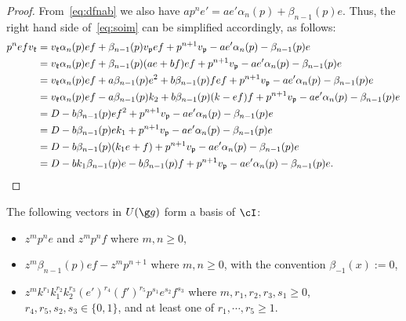 \documentclass[11pt]{amsart}
\begin{document}
\begin{proof}
From~\eqref{eq:dfnab} we also have
$ap^ne'=ae'\alpha_{n}(p)+\beta_{n-1}(p)e$.
Thus, the right hand side of~\eqref{eq:soim} can be simplified accordingly, as follows: 
\begin{align*}
p^nefv_{\mathfrak k}&=v_{\mathfrak k}\alpha_{n}(p)ef+\beta_{n-1}(p)v_{\mathfrak p}ef+p^{n+1}v_{\mathfrak p}-ae'\alpha_{n}(p)-\beta_{n-1}(p)e\\
&=v_{\mathfrak k}\alpha_{n}(p)ef+\beta_{n-1}(p)(ae+bf)ef+p^{n+1}v_{\mathfrak p}-ae'\alpha_{n}(p)-\beta_{n-1}(p)e\\
&=v_{\mathfrak k}\alpha_{n}(p)ef+a\beta_{n-1}(p)e^2+b\beta_{n-1}(p)fef+p^{n+1}v_{\mathfrak p}-ae'\alpha_{n}(p)-\beta_{n-1}(p)e\\
&=v_{\mathfrak k}\alpha_{n}(p)ef-a\beta_{n-1}(p)k_2+b\beta_{n-1}(p)(k-ef)f+p^{n+1}v_{\mathfrak p}-ae'\alpha_{n}(p)-\beta_{n-1}(p)e\\
&=D-b\beta_{n-1}(p)ef^2+p^{n+1}v_{\mathfrak p}-ae'\alpha_{n}(p)-\beta_{n-1}(p)e\\
&=D-b\beta_{n-1}(p)ek_1+p^{n+1}v_{\mathfrak p}-ae'\alpha_{n}(p)-\beta_{n-1}(p)e\\
&=D-b\beta_{n-1}(p)(k_1e+f)+p^{n+1}v_{\mathfrak p}-ae'\alpha_{n}(p)-\beta_{n-1}(p)e\\
&=D-bk_1\beta_{n-1}(p)e-b\beta_{n-1}(p)f+p^{n+1}v_{\mathfrak p}-ae'\alpha_{n}(p)-\beta_{n-1}(p)e.\qedhere
\end{align*}
\end{proof}
\begin{theorem}\label{basis of I}
The following vectors in $U(\g g)$ form  a basis of $\cI$:

\begin{itemize}
\item[\rm (i)] $z^mp^ne$ and $z^mp^nf$ where $m,n\geqslant 0$,
\item[\rm (ii)] $z^m\beta_{n-1}(p)ef-z^mp^{n+1}$ where $m,n\geqslant 0$, with the convention $\beta_{-1}(x):=0$,\item[\rm (iii)] $z^mk^{r_1}k_1^{r_2}k_2^{r_3}(e')^{r_4}(f')^{r_5}p^{s_1}e^{s_2}f^{s_3}$ where $m,r_1,r_2,r_3,s_1\geq 0$, $r_4,r_5,s_2,s_3\in\{0,1\}$, and 
 at least one of $r_1,\cdots , r_5\geq 1$.
\end{itemize}\end{theorem}
\end{document}
